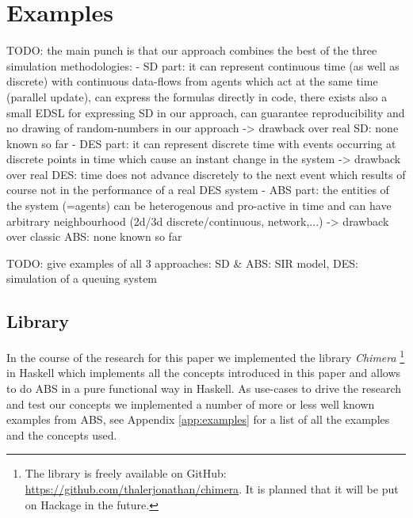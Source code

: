 \section{Examples}
TODO: the main punch is that our approach combines the best of the three simulation methodologies:
	- SD part: 	it can represent continuous time (as well as discrete) with continuous data-flows from agents which act at the same time (parallel update), can express the formulas directly in code, there exists also a small EDSL for expressing SD in our approach, can guarantee reproducibility and no drawing of random-numbers in our approach
		-> drawback over real SD: none known so far 
	- DES part: it can represent discrete time with events occurring at discrete points in time which cause an instant change in the system
		-> drawback over real DES: time does not advance discretely to the next event which results of course not in the performance of a real DES system
	- ABS part:	the entities of the system (=agents) can be heterogenous and pro-active in time and can have arbitrary neighbourhood (2d/3d discrete/continuous, network,...)
		-> drawback over classic ABS: none known so far 

TODO: give examples of all 3 approaches: SD \& ABS: SIR model, DES: simulation of a queuing system

\subsection{Library}
In the course of the research for this paper we implemented the library \textit{Chimera} \footnote{The library is freely available on GitHub: \url{https://github.com/thalerjonathan/chimera}. It is planned that it will be put on Hackage in the future.} in Haskell which implements all the concepts introduced in this paper and allows to do ABS in a pure functional way in Haskell. As use-cases to drive the research and test our concepts we implemented a number of more or less well known examples from ABS, see Appendix \ref{app:examples} for a list of all the examples and the concepts used.